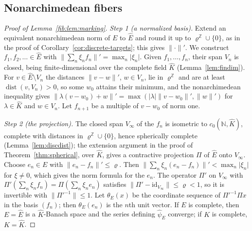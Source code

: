 \documentclass[11pt]{amsart}
\theoremstyle{definition}
\theoremstyle{remark}
\numberwithin{equation}{section}
\newcommand{\N}{\mathbb N}
\newcommand{\Z}{\mathbb Z}
\newcommand{\id}{\mathrm{id}}
\newcommand{\abs}[1]{\lvert #1\rvert}
\newcommand{\norm}[1]{\lVert #1\rVert}
\newcommand{\Kh}{\widehat K}
\theoremstyle{plain}
\theoremstyle{definition}
\theoremstyle{plain}
\begin{document}
\subsection{Nonarchimedean fibers}\label{frc:ssec:nonarch}
\begin{proof}[Proof of Lemma~\ref{fib:lem:marking}]
\emph{Step 1 (a normalized basis).} Extend an equivalent nonarchimedean norm of $E$ to $\widehat E$ and round it up to
$\varrho^\Z\cup\{0\}$, as in the proof of Corollary~\ref{cor:discrete-targets}; this gives $\norm\cdot'$. We construct
$f_1,f_2,\dots\in\widehat E$ with $\norm{\sum_n\xi_nf_n}'=\max_n\abs{\xi_n}$. Given $f_1,\dots,f_n$, their span $V_n$ is
closed, being finite-dimensional over the complete field $\Kh$ (Lemma~\ref{lem:findim}). For $v\in\widehat E\setminus V_n$
the distances $\norm{v-w}'$, $w\in V_n$, lie in $\varrho^\Z$ and are at least $\operatorname{dist}(v,V_n)>0$, so some
$w_0$ attains their minimum, and the nonarchimedean inequality gives
$\norm{\lambda(v-w_0)+w}'=\max(\abs\lambda\norm{v-w_0}',\norm w')$ for $\lambda\in\Kh$ and $w\in V_n$. Let $f_{n+1}$ be a
multiple of $v-w_0$ of norm one.

\emph{Step 2 (the projection).} The closed span $V_\infty$ of the $f_n$ is isometric to $c_0(\N,\Kh)$, complete with
distances in $\varrho^\Z\cup\{0\}$, hence spherically complete (Lemma~\ref{lem:discdist}); the extension argument in the
proof of Theorem~\ref{thm:spherical}, over $\Kh$, gives a contractive projection $\Pi$ of $\widehat E$ onto $V_\infty$.
Choose $e_n\in E$ with $\norm{e_n-f_n}'\le\varrho$. Then $\norm{\sum_n\xi_n(e_n-f_n)}'<\max_n\abs{\xi_n}$ for $\xi\ne0$,
which gives the norm formula for the $e_n$. The operator $\Pi'$ on $V_\infty$ with
$\Pi'(\sum_n\xi_nf_n)=\Pi(\sum_n\xi_ne_n)$ satisfies $\norm{\Pi'-\id_{V_\infty}}\le\varrho<1$, so it is invertible with
$\norm{\Pi'^{-1}}\le1$. Let $\theta_E(x)$ be the coordinate sequence of $\Pi'^{-1}\Pi x$ in the basis $(f_n)$; then
$\theta_E(e_n)$ is the $n$th unit vector. If $E$ is complete, then $E=\widehat E$ is a $\Kh$\nobreakdash-Banach space and
the series defining $\widehat\psi_E$ converge; if $K$ is complete, $K=\Kh$.
\end{proof}
\end{document}
